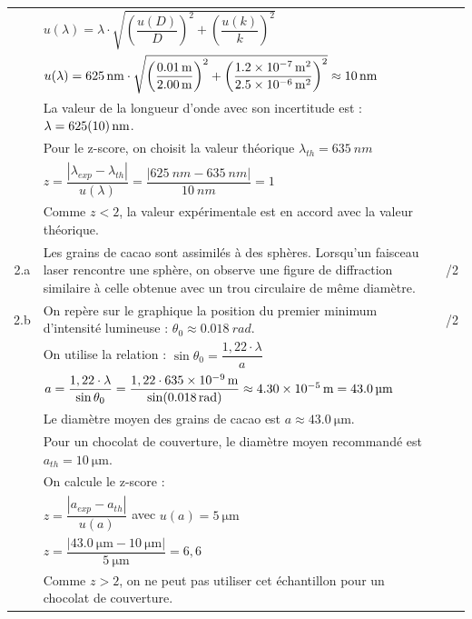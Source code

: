 \documentclass[a4paper,14pt,fleqn]{article}%
\begin{document}
\begin{table}[h!]
\begin{center}
\begin{tabular}{|c|m{15cm}|c|}
             & $u(\lambda) = \lambda \cdot \sqrt{\left(\dfrac{u(D)}{D}\right)^2 + \left(\dfrac{u(k)}{k}\right)^2}$ & \\
             & $u(\lambda) = \SI{625}{nm} \cdot \sqrt{\left(\dfrac{\SI{0,01}{m}}{\SI{2,00}{m}}\right)^2 + \left(\dfrac{\SI{1,2E-7}{\meter\squared}}{\SI{2,5E-6}{\meter\squared}}\right)^2} \approx \SI{10}{nm}$ & \\
             & La valeur de la longueur d'onde avec son incertitude est : $\lambda = \SI{625 \pm 10}{nm}$. & \\
             & Pour le z-score, on choisit la valeur théorique $\lambda_{th} = \SI{635}{nm}$ & \\
             & $z = \dfrac{|\lambda_{exp} - \lambda_{th}|}{u(\lambda)} = \dfrac{|\SI{625}{nm} - \SI{635}{nm}|}{\SI{10}{nm}} = 1$ & \\
             & Comme $z < 2$, la valeur expérimentale est en accord avec la valeur théorique. & \\
             \hline
            2.a & Les grains de cacao sont assimilés à des sphères. Lorsqu'un faisceau laser rencontre une sphère, on observe une figure de diffraction similaire à celle obtenue avec un trou circulaire de même diamètre. & /2\\
             \hline
            2.b & On repère sur le graphique la position du premier minimum d'intensité lumineuse : $\theta_0 \approx \SI{0,018}{rad}$. & /2\\
             & On utilise la relation : $\sin \theta_0 = \dfrac{1,22 \cdot \lambda}{a}$ & \\
             & $a = \dfrac{1,22 \cdot \lambda}{\sin \theta_0} = \dfrac{1,22 \cdot \SI{635E-9}{m}}{\sin(\SI{0,018}{rad})} \approx \SI{4,30E-5}{m} = \SI{43,0}{\micro\meter}$ & \\
             & Le diamètre moyen des grains de cacao est $a \approx \SI{43,0}{\micro\meter}$. & \\
             & Pour un chocolat de couverture, le diamètre moyen recommandé est $a_{th} = \SI{10}{\micro\meter}$. & \\
             & On calcule le z-score : & \\
             & $z = \dfrac{|a_{exp} - a_{th}|}{u(a)}$ avec $u(a) = \SI{5}{\micro\meter}$ & \\
             & $z = \dfrac{|\SI{43,0}{\micro\meter} - \SI{10}{\micro\meter}|}{\SI{5}{\micro\meter}} = 6,6$ & \\
             & Comme $z > 2$, on ne peut pas utiliser cet échantillon pour un chocolat de couverture. & \\
             \hline
        \end{tabular}
    \end{center}
\end{table}
\end{document}

